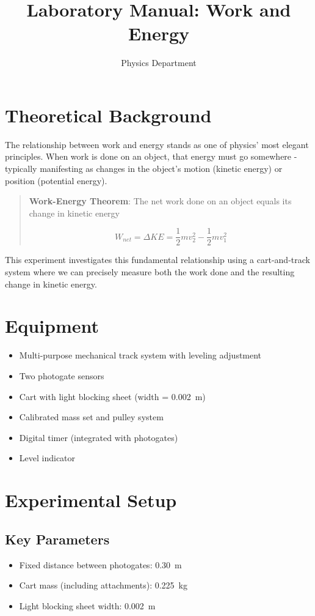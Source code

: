 \documentclass[12pt]{article}
\title{Laboratory Manual: Work and Energy}
\author{Physics Department}
\date{}
\begin{document}
\maketitle

\section{Theoretical Background}

The relationship between work and energy stands as one of physics' most elegant principles. When work is done on an object, that energy must go somewhere - typically manifesting as changes in the object's motion (kinetic energy) or position (potential energy).

\begin{quote}
\textbf{Work-Energy Theorem}: The net work done on an object equals its change in kinetic energy

$$W_{net} = \Delta KE = \frac{1}{2}mv_2^2 - \frac{1}{2}mv_1^2$$
\end{quote}

This experiment investigates this fundamental relationship using a cart-and-track system where we can precisely measure both the work done and the resulting change in kinetic energy.

\section{Equipment}
\begin{itemize}
\item Multi-purpose mechanical track system with leveling adjustment
\item Two photogate sensors
\item Cart with light blocking sheet (width = \SI{0.002}{\meter})
\item Calibrated mass set and pulley system
\item Digital timer (integrated with photogates)
\item Level indicator
\end{itemize}

\section{Experimental Setup}

\subsection{Key Parameters}
\begin{itemize}
\item Fixed distance between photogates: \SI{0.30}{\meter}
\item Cart mass (including attachments): \SI{0.225}{\kilogram}
\item Light blocking sheet width: \SI{0.002}{\meter}
\end{itemize}
\end{document}
